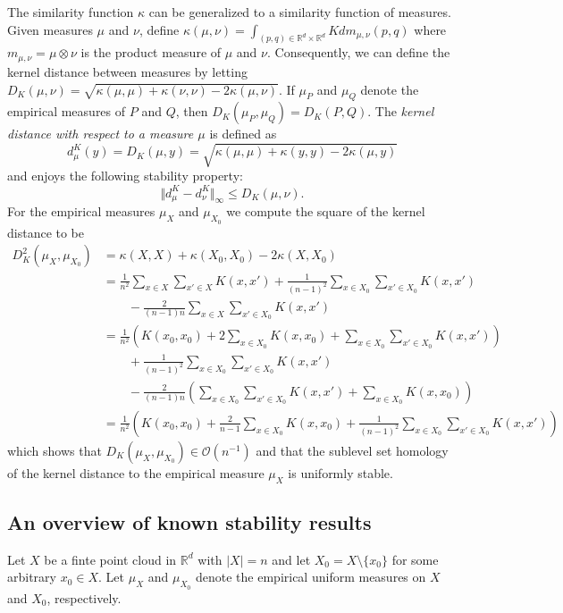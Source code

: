 \documentclass[10pt,a4paper]{article}
\theoremstyle{definition}
\newcommand{\R}{\mathbb{R}}
\begin{document}
The similarity function $\kappa$ can be generalized to a similarity function of measures. Given measures $\mu$ and $\nu$, define $\kappa(\mu,\nu)=\int_{(p,q)\in\R^d\times\R^d}Kdm_{\mu,\nu}(p,q)$ where $m_{\mu,\nu}=\mu\otimes\nu$ is the product measure of $\mu$ and $\nu$. Consequently, we can define the kernel distance between measures by letting $D_K(\mu,\nu) = \sqrt{\kappa(\mu,\mu)+\kappa(\nu,\nu)-2\kappa(\mu,\nu)}$. If $\mu_P$ and $\mu_Q$ denote the empirical measures of $P$ and $Q$, then $D_K(\mu_P, \mu_Q) = D_K(P,Q)$. The \textit{kernel distance with respect to a measure $\mu$} is defined as $$d_\mu^K(y)=D_K(\mu,y)=\sqrt{\kappa(\mu,\mu)+\kappa(y,y)-2\kappa(\mu,y)}$$
and enjoys the following stability property:
$$
\Vert d_\mu^K - d_\nu^K\Vert_\infty\leq D_K(\mu, \nu).
$$
For the empirical measures $\mu_X$ and $\mu_{X_0}$ we compute the square of the kernel distance to be
\begin{align*}
	D_K^2(\mu_X,\mu_{X_0}) &=  \kappa(X,X)+\kappa(X_0,X_0)-2\kappa(X,X_0)
	\\ 
	&= \frac{1}{n^2}\sum_{x\in X}\sum_{x'\in X}K(x,x') + \frac{1}{(n-1)^2}\sum_{x\in X_0}\sum_{x'\in X_0}K(x,x')\\&\qquad - \frac{2}{(n-1)n}\sum_{x\in X}\sum_{x'\in X_0}K(x,x')\\
	&= \frac{1}{n^2}\left(K(x_0, x_0) + 2\sum_{x\in X_0}K(x,x_0)+\sum_{x\in X_0}\sum_{x'\in X_0}K(x,x')\right)\\
	&\qquad+\frac{1}{(n-1)^2}\sum_{x\in X_0}\sum_{x'\in X_0}K(x,x')\\
	&\qquad-\frac{2}{(n-1)n}\left(\sum_{x\in X_0}\sum_{x'\in X_0}K(x,x') + \sum_{x\in X_0}K(x,x_0)\right)\\
	&= \frac{1}{n^2}\left(K(x_0,x_0) + \frac{2}{n-1}\sum_{x\in X_0}K(x,x_0) + \frac{1}{(n-1)^2}\sum_{x\in X_0}\sum_{x'\in X_0}K(x,x')\right)
\end{align*}
which shows that $D_K(\mu_X,\mu_{X_0})\in\mathcal{O}(n^{-1})$ and that the sublevel set homology of the kernel distance to the empirical measure $\mu_X$ is uniformly stable.

\subsection{An overview of known stability results}
Let $X$ be a finte point cloud in $\R^d$ with $|X|=n$ and let $X_0 = X\setminus\{x_0\}$ for some arbitrary $x_0\in X$. Let $\mu_X$ and $\mu_{X_0}$ denote the empirical uniform measures on $X$ and $X_0$, respectively.
\end{document}
